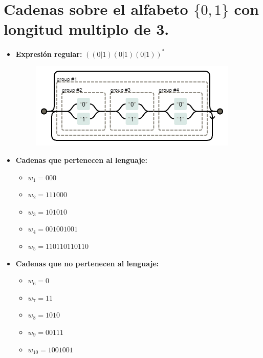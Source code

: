 \documentclass[11pt]{report}
\begin{document}
\newpage

\section{Cadenas sobre el alfabeto \texorpdfstring{$\{0, 1\}$}{\{0, 1\}} con longitud multiplo de 3.}
\begin{itemize}
  \item \textbf{Expresión regular:} $((0|1)(0|1)(0|1))^*$
    \begin{figure}[H]
      \centering
      \includegraphics[scale=0.8]{img/op_basicos_06.png}
    \end{figure}
  \item \textbf{Cadenas que pertenecen al lenguaje: }
    \begin{itemize}
      \item $w_1 = 000$
      \item $w_2 = 111000$
      \item $w_3 = 101010$
      \item $w_4 = 001001001$
      \item $w_5 = 110110110110$
    \end{itemize}
  \item \textbf{Cadenas que no pertenecen al lenguaje: }
    \begin{itemize}
      \item $w_6 = 0$
      \item $w_7 = 11$
      \item $w_8 = 1010$
      \item $w_9 = 00111$
      \item $w_{10} = 1001001$
    \end{itemize}
\end{itemize}

\newpage
\end{document}
